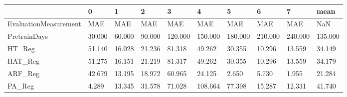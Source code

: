 \begin{tabular}{llllllllll}
\toprule
{} &      0 &      1 &      2 &       3 &       4 &       5 &       6 &       7 &    mean \\
\midrule
EvaluationMeasurement &    MAE &    MAE &    MAE &     MAE &     MAE &     MAE &     MAE &     MAE &     NaN \\
PretrainDays          & 30.000 & 60.000 & 90.000 & 120.000 & 150.000 & 180.000 & 210.000 & 240.000 & 135.000 \\
HT\_Reg                & 51.140 & 16.028 & 21.236 &  81.318 &  49.262 &  30.355 &  10.296 &  13.559 &  34.149 \\
HAT\_Reg               & 51.275 & 16.151 & 21.219 &  81.317 &  49.262 &  30.355 &  10.296 &  13.559 &  34.179 \\
ARF\_Reg               & 42.679 & 13.195 & 18.972 &  60.965 &  24.125 &   2.650 &   5.730 &   1.955 &  21.284 \\
PA\_Reg                &  4.289 & 13.345 & 31.578 &  71.028 & 108.664 &  77.398 &  15.287 &  12.331 &  41.740 \\
\bottomrule
\end{tabular}
